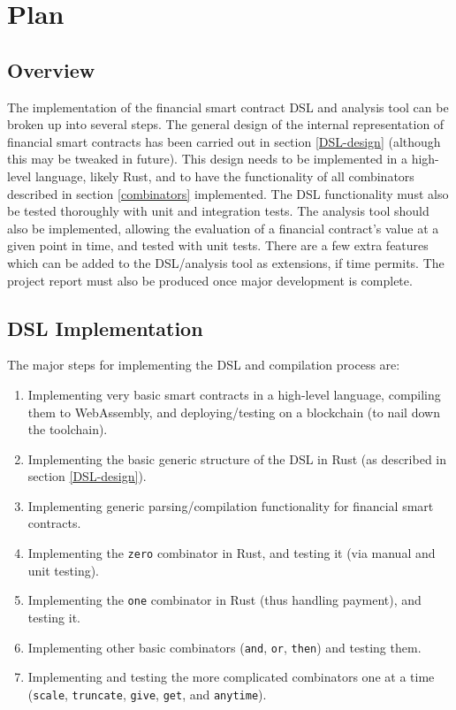 \chapter{Plan}

\section{Overview}

The implementation of the financial smart contract DSL and analysis tool can be broken up into several steps. The general design of the internal representation of financial smart contracts has been carried out in section \ref{DSL-design} (although this may be tweaked in future). This design needs to be implemented in a high-level language, likely Rust, and to have the functionality of all combinators described in section \ref{combinators} implemented. The DSL functionality must also be tested thoroughly with unit and integration tests. The analysis tool should also be implemented, allowing the evaluation of a financial contract's value at a given point in time, and tested with unit tests. There are a few extra features which can be added to the DSL/analysis tool as extensions, if time permits. The project report must also be produced once major development is complete.

\section{DSL Implementation} \label{DSL-implentation-timeframe}

The major steps for implementing the DSL and compilation process are:
\begin{enumerate}
    \item Implementing very basic smart contracts in a high-level language, compiling them to WebAssembly, and deploying/testing on a blockchain (to nail down the toolchain).
    \item Implementing the basic generic structure of the DSL in Rust (as described in section \ref{DSL-design}).
    \item Implementing generic parsing/compilation functionality for financial smart contracts.
    \item Implementing the \texttt{zero} combinator in Rust, and testing it (via manual and unit testing).
    \item Implementing the \texttt{one} combinator in Rust (thus handling payment), and testing it.
    \item Implementing other basic combinators (\texttt{and}, \texttt{or}, \texttt{then}) and testing them.
    \item Implementing and testing the more complicated combinators one at a time (\texttt{scale}, \texttt{truncate}, \texttt{give}, \texttt{get}, and \texttt{anytime}).
\end{enumerate}


